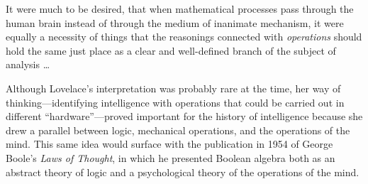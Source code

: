 \documentclass[version=last,draft=false,paper=A4,portrait,twoside=true,twocolumn=false,headinclude=false,footinclude=false,fontsize=12,BCOR=20mm,DIV=calc,pagesize=auto,titlepage=firstiscover,mpinclude=false,open=right,chapterprefix=true,numbers=autoendperiod,headsepline=false,headings=twolinechapter,parskip=false]{scrbook}
\begin{document}
\begin{displayquote}
It were much to be desired, that when mathematical processes pass through
the human brain instead of through the medium of inanimate mechanism, it
were equally a necessity of things that the reasonings connected with
\emph{operations} should hold the same just place as a clear and well-defined
branch of the subject of analysis \ldots
\end{displayquote}

Although Lovelace's interpretation was probably rare at the time, her way
of thinking---identifying intelligence with operations that could be
carried out in different ``hardware''---proved important for the history of
intelligence because she drew a parallel between logic, mechanical
operations, and the operations of the mind. This same idea would surface
with the publication in 1954 of George Boole's \emph{Laws of Thought}, in which he
presented Boolean algebra both as an abstract theory of logic and a
psychological theory of the operations of the mind.
\end{document}
